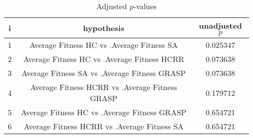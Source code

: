 \documentclass[a4paper,10pt]{article}
\begin{document}
\begin{landscape}
\begin{table}[!htp]
\centering\scriptsize
\begin{tabular}{ccc}
i&hypothesis&unadjusted $p$\\
\hline1&Average Fitness HC     vs .Average Fitness SA  &0.025347\\
2&Average Fitness HC     vs .Average Fitness HCRR   &0.073638\\
3&Average Fitness SA   vs .Average Fitness GRASP&0.073638\\
4&Average Fitness HCRR    vs .Average Fitness GRASP&0.179712\\
5&Average Fitness HC     vs .Average Fitness GRASP&0.654721\\
6&Average Fitness HCRR    vs .Average Fitness SA  &0.654721\\
\hline
\end{tabular}
\caption{Adjusted $p$-values}
\end{table}

\end{landscape}
\end{document}
